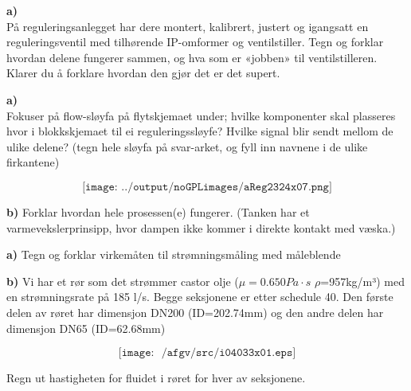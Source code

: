 \vfil \eject
\oppgave{}%
\textbf{a)}\\
På reguleringsanlegget har dere montert, kalibrert, justert og igangsatt en reguleringsventil med tilhørende IP-omformer og ventilstiller. Tegn og forklar hvordan delene fungerer sammen, og hva som er «jobben» til ventilstilleren. Klarer du å forklare hvordan den gjør det er det supert.  
\vskip 1cm 
\vskip 1cm 

\vfil \eject
\oppgave{}%
\textbf{a)}\\
Fokuser på flow-sløyfa på flytskjemaet under; hvilke komponenter skal plasseres hvor i blokkskjemaet til ei reguleringssløyfe? Hvilke signal blir sendt mellom de ulike delene? (tegn hele sløyfa på svar-arket, og fyll inn navnene i de ulike firkantene) 

$$\texttt{[image: ../output/noGPLimages/aReg2324x07.png]}$$
\vskip 1cm 
\vskip 1cm 
\textbf{b)}
Forklar hvordan hele prosessen(e) fungerer. (Tanken har et varmevekslerprinsipp, hvor dampen ikke kommer i direkte kontakt med væska.)

\vskip 1cm 
\vskip 1cm 

\vfil \eject


\vfil \eject
\oppgave{}%
\textbf{a)}
Tegn og forklar virkemåten til strømningsmåling med måleblende
\vskip 1cm
\vskip 1cm

\textbf{b)}
Vi har et rør som det strømmer castor olje ($\mu=0.650 Pa\cdot s$ $\rho$=957kg/m³) med en strømningsrate på 185 l/s. Begge seksjonene er etter schedule 40.  Den første delen av røret har dimensjon DN200 (ID=202.74mm) og den andre delen har dimensjon DN65 (ID=62.68mm)

$$\texttt{[image: ~/afgv/src/i04033x01.eps]}$$

Regn ut hastigheten for fluidet i røret for hver av seksjonene. 
\vskip 1cm
\vskip 1cm


